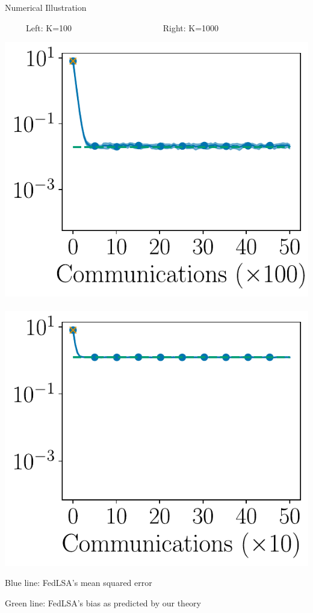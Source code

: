 \documentclass[aspectratio=169,12pt]{beamer}
\begin{document}
\begin{frame}{Numerical Illustration}
  \vspace{-0.5em}
  
  \begin{center}
    ~~~~~Left: K=100~~~~~~~~~~~~~~~~~~~~~
    Right: K=1000
 
    \vspace{-1em}
   
    \includegraphics[width=0.4\linewidth]{images/plot_hg_100_n100_fedlsa.pdf}
    ~~
    \includegraphics[width=0.4\linewidth]{images/plot_hg_1000_n100_fedlsa.pdf}
  \end{center}

  \vspace{-1em}

  Blue line: FedLSA's mean squared error

  \vspace{-1em}

  Green line: FedLSA's bias as predicted by our theory


\end{frame}
\end{document}
